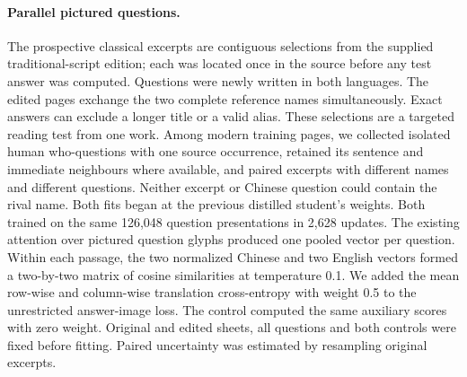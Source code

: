\documentclass[12pt,a4paper]{article}
\providecommand{\DIFadd}[1]{{\protect\color{blue} \sf #1}} %
\begin{document}
\paragraph{\DIFadd{Parallel pictured questions.}}
\DIFadd{The prospective classical excerpts are contiguous selections from the supplied traditional-script edition; each was located once in the source before any test answer was computed. Questions were newly written in both languages. The edited pages exchange the two complete reference names simultaneously. Exact answers can exclude a longer title or a valid alias. These selections are a targeted reading test from one work. Among modern training pages, we collected isolated human who-questions with one source occurrence, retained its sentence and immediate neighbours where available, and paired excerpts with different names and different questions. Neither excerpt or Chinese question could contain the rival name. Both fits began at the previous distilled student's weights. Both trained on the same 126,048 question presentations in 2,628 updates. The existing attention over pictured question glyphs produced one pooled vector per question. Within each passage, the two normalized Chinese and two English vectors formed a two-by-two matrix of cosine similarities at temperature 0.1. We added the mean row-wise and column-wise translation cross-entropy with weight 0.5 to the unrestricted answer-image loss. The control computed the same auxiliary scores with zero weight. Original and edited sheets, all questions and both controls were fixed before fitting. Paired uncertainty was estimated by resampling original excerpts.
}
\end{document}
